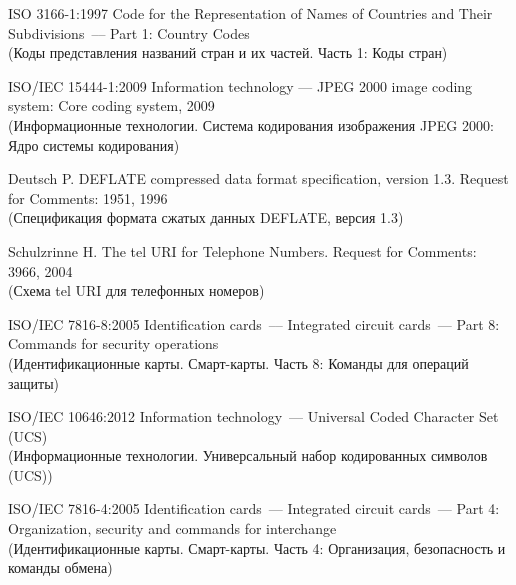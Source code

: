\clearpage
\renewcommand{\bibname}{Библиография}
\begin{thebibliography}{9}

ISO 3166-1:1997 Code for the Representation of Names of Countries and 
Their Subdivisions~--– Part 1: Country Codes\\
{\small (Коды представления названий стран и их частей. Часть 1: Коды 
стран)}

ISO/IEC 15444-1:2009 Information technology --- 
JPEG 2000 image coding system: Core coding system, 2009\\
{\small (Информационные технологии. Система кодирования изображения JPEG 
2000: Ядро системы кодирования)}

Deutsch P. DEFLATE compressed data format specification, version 1.3.
Request for Comments:  1951, 1996\\
{\small (Спецификация формата сжатых данных DEFLATE, версия 1.3)}
\fi

Schulzrinne H. The tel URI for Telephone Numbers. Request for Comments:  3966, 2004\\ 
{\small (Схема tel URI для телефонных номеров)}

ISO/IEC 7816-8:2005 Identification cards~--– Integrated circuit cards~--- 
Part 8: Commands for security operations\\ 
{\small (Идентификационные карты. Смарт-карты. Часть 8: Команды для 
операций защиты)}

ISO/IEC 10646:2012 Information technology~--- Universal Coded Character 
Set (UCS)\\
{\small (Информационные технологии. Универсальный набор кодированных 
символов (UCS))}

ISO/IEC 7816-4:2005 Identification cards~--- Integrated circuit cards~--- 
Part 4: Organization, security and commands for interchange\\
{\small (Идентификационные карты. Смарт-карты. 
Часть 4: Организация, безопасность и команды обмена)}

\label{LastBib}
\end{thebibliography}



